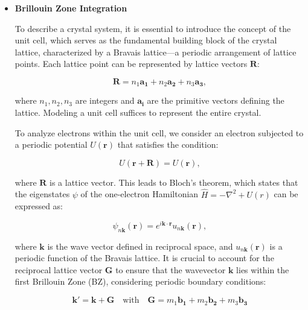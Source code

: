 \begin{itemize}  
	
	\item \textbf{Brillouin Zone Integration}  
	
	To describe a crystal system, it is essential to introduce the concept of the unit cell, which serves as the fundamental building block of the crystal lattice, characterized by a Bravais lattice—a periodic arrangement of lattice points. Each lattice point can be represented by lattice vectors $\mathbf{R}$:  
	
	\begin{equation}  
		\mathbf{R} = n_1 \mathbf{a_1} + n_2 \mathbf{a_2} + n_3 \mathbf{a_3},  
	\end{equation}  
	
	where $n_1, n_2, n_3$ are integers and $\mathbf{a_i}$ are the primitive vectors defining the lattice. Modeling a unit cell suffices to represent the entire crystal.  
	
	To analyze electrons within the unit cell, we consider an electron subjected to a periodic potential $U(\mathbf{r})$ that satisfies the condition:  
	
	\begin{equation}  
		U(\mathbf{r} + \mathbf{R}) = U(\mathbf{r}),  
	\end{equation}  
	
	where $\mathbf{R}$ is a lattice vector. This leads to Bloch's theorem, which states that the eigenstates $\psi$ of the one-electron Hamiltonian $\hat{H} = -\nabla^2 + U(r)$ can be expressed as:  
	
	\begin{equation}  
		\psi_{n\mathbf{k}}(\mathbf{r}) = e^{i\mathbf{k} \cdot \mathbf{r}} u_{n\mathbf{k}}(\mathbf{r}),  
		\label{eq:2.87}  
	\end{equation}  
	
	where $\mathbf{k}$ is the wave vector defined in reciprocal space, and $u_{n\mathbf{k}}(\mathbf{r})$ is a periodic function of the Bravais lattice. It is crucial to account for the reciprocal lattice vector $\mathbf{G}$ to ensure that the wavevector $\mathbf{k}$ lies within the first Brillouin Zone (BZ), considering periodic boundary conditions:  
	
	\begin{equation}  
		\mathbf{k'} = \mathbf{k}+\mathbf{G} \quad \text{with} \quad \mathbf{G}= m_{1}\mathbf{b_1}+m_{2}\mathbf{b_2}+m_{3}\mathbf{b_3}  
	\end{equation}  
	

\end{itemize}
